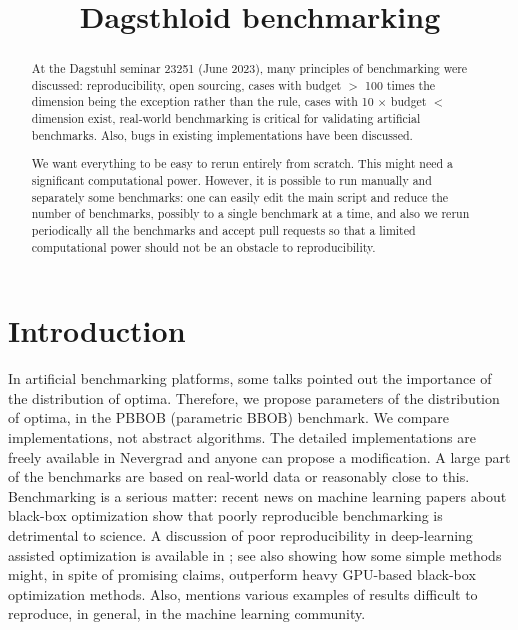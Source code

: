 \documentclass{article}
\begin{document}
\title{Dagsthloid benchmarking}

\maketitle


\begin{abstract}
At the Dagstuhl seminar 23251 (June 2023), many principles of benchmarking were discussed: reproducibility, open sourcing, cases with budget $>$ 100 times the dimension being the exception rather than the rule, cases with 10 $\times$ budget $<$ dimension exist, real-world benchmarking is critical for validating artificial benchmarks. Also, bugs in existing implementations have been discussed.

We want everything to be easy to rerun entirely from scratch. This might need a significant computational power.
However, it is possible to run manually and separately some benchmarks: one can easily edit the main script and reduce the number of benchmarks, possibly to a single benchmark at a time, and also we rerun periodically all the benchmarks and accept pull requests so that a limited computational power should not be an obstacle to reproducibility.
\end{abstract}
\tableofcontents

\section{Introduction}

In artificial benchmarking platforms, some talks pointed out the importance of the distribution of optima. Therefore, we propose parameters of the distribution of optima, in the PBBOB (parametric BBOB) benchmark.
We compare implementations, not abstract algorithms. The detailed implementations are freely available in Nevergrad and anyone can propose a modification.
A large part of the benchmarks are based on real-world data or reasonably close to this.
Benchmarking is a serious matter: recent news on machine learning papers about black-box optimization show that poorly reproducible benchmarking is detrimental to science. 
A discussion of poor reproducibility in deep-learning assisted optimization is available in \cite{rlgoogle}; see also \cite{ecnassurvey,repronas,pham2018efficient,real2019regularized} showing how some simple methods might, in spite of promising claims, outperform heavy GPU-based black-box optimization methods. Also, \cite{leakage} mentions various examples of results difficult to reproduce, in general, in the machine learning community.
\end{document}
